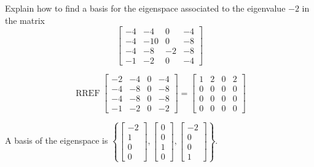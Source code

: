 
\begin{exerciseStatement}


Explain how to find a basis for the eigenspace associated to the eigenvalue \( -2 \) in the matrix \[ \left[\begin{array}{cccc}
-4 & -4 & 0 & -4 \\
-4 & -10 & 0 & -8 \\
-4 & -8 & -2 & -8 \\
-1 & -2 & 0 & -4
\end{array}\right] \]


\end{exerciseStatement}
    
\begin{exerciseAnswer} 


\[\operatorname{RREF} \left[\begin{array}{cccc}
-2 & -4 & 0 & -4 \\
-4 & -8 & 0 & -8 \\
-4 & -8 & 0 & -8 \\
-1 & -2 & 0 & -2
\end{array}\right] = \left[\begin{array}{cccc}
1 & 2 & 0 & 2 \\
0 & 0 & 0 & 0 \\
0 & 0 & 0 & 0 \\
0 & 0 & 0 & 0
\end{array}\right] \]



A basis of the eigenspace is \( \left\{ \left[\begin{array}{c}
-2 \\
1 \\
0 \\
0
\end{array}\right] , \left[\begin{array}{c}
0 \\
0 \\
1 \\
0
\end{array}\right] , \left[\begin{array}{c}
-2 \\
0 \\
0 \\
1
\end{array}\right] \right\} \).


\end{exerciseAnswer}
    
